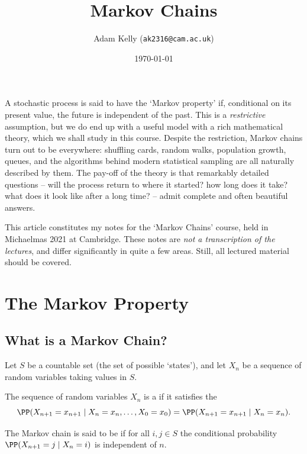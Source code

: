 \documentclass[a4paper]{scrartcl}
\title{Markov Chains}
\author{Adam Kelly (\texttt{ak2316@cam.ac.uk})}
\date{\today}
\begin{document}
\maketitle

A stochastic process is said to have the `Markov property' if, conditional on its present value, the future is independent of the past.
This is a \emph{restrictive} assumption, but we do end up with a useful model with a rich mathematical theory, which we shall study in this course.
Despite the restriction, Markov chains turn out to be everywhere: shuffling cards, random walks, population growth, queues, and the algorithms behind modern statistical sampling are all naturally described by them. The pay-off of the theory is that remarkably detailed questions -- will the process return to where it started? how long does it take? what does it look like after a long time? -- admit complete and often beautiful answers.

This article constitutes my notes for the `Markov Chains' course, held in Michaelmas 2021 at Cambridge. These notes are \emph{not a transcription of the lectures}, and differ significantly in quite a few areas. Still, all lectured material should be covered.


\tableofcontents


\section{The Markov Property}

\subsection{What is a Markov Chain?}

Let $S$ be a countable set (the set of possible `states'), and let $X_n$ be a sequence of random variables taking values in $S$.

\begin{definition}
	The sequence of random variables $X_n$ is a  if it satisfies the 
	$$
	\PP(X_{n + 1} = x_{n + 1} \mid X_n = x_n, \dots, X_0 = x_0) = \PP(X_{n + 1} = x_{n + 1} \mid X_n = x_n).
	$$

	The Markov chain is said to be  if for all $i, j \in S$ the conditional probability $\PP(X_{n + 1} = j \mid X_n = i)$ is independent of $n$.
\end{definition}
\end{document}
